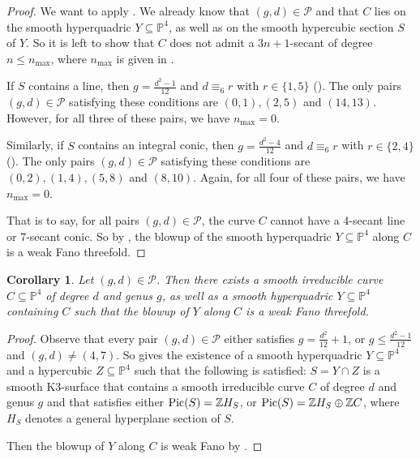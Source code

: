 \documentclass[english,11pt,reqno]{amsart}
\newcommand{\sub}{\subseteq}
\newcommand{\Pfour}{\mathbb{P}^4}
\newcommand{\Z}{\mathbb{Z}}
\newcommand{\Pic}{\textup{Pic}}
\newtheorem{cor}[thm]{Corollary}
\begin{document}
%
%
%
\begin{proof}
We want to apply . We already know that $(g,d)\in \mathcal{P}$ and that $C$ lies on the smooth hyperquadric $Y\sub \Pfour$, as well as on the smooth hypercubic section $S$ of $Y$. So it is left to show that $C$ does not admit a $3n+1$-secant of degree $n\leq n_{\max}$, where $n_{\max}$ is given in . \par
If $S$ contains a line, then $g=\frac{d^2-1}{12}$ and $d\equiv_6 r$ with $r\in\{1,5\}$ (). The only pairs $(g,d)\in \mathcal{P}$ satisfying these conditions are $(0,1),(2,5)$ and $(14,13)$. However, for all three of these pairs, we have $n_{\max}=0$. \par 
Similarly, if $S$ contains an integral conic, then $g=\frac{d^2-4}{12}$ and $d\equiv_6 r$ with $r\in\{2,4\}$ (). The only pairs $(g,d)\in \mathcal{P}$ satisfying these conditions are $(0,2),(1,4), (5,8)$ and $(8,10)$. Again, for all four of these pairs, we have $n_{\max}=0$. \par
That is to say, for all pairs $(g,d)\in \mathcal{P}$, the curve $C$ cannot have a 4-secant line or 7-secant conic. So by  , the blowup of the smooth hyperquadric $Y\sub \Pfour$ along $C$ is a weak Fano threefold.
\end{proof}
%
%
\begin{cor} \label{cor:existence_gdpairs_yielding_weak_Fano}
Let $(g,d)\in\mathcal{P}$. Then there exists a smooth irreducible curve $C\sub \Pfour$ of degree $d$ and genus $g$, as well as a smooth hyperquadric $Y\sub \Pfour$ containing $C$ such that the blowup of $Y$ along $C$ is a weak Fano threefold. 
\end{cor}
%
\begin{proof}
Observe that every pair $(g,d)\in \mathcal{P}$ either satisfies $g=\frac{d^2}{12}+1$, or $g\leq \frac{d^2-1}{12}$ and $(g,d)\neq(4,7)$. So  gives the existence of a smooth hyperquadric $Y\sub \Pfour$ and a hypercubic $Z\sub \Pfour$ such that the following is satisfied: $S=Y\cap Z$ is a smooth K3-surface that contains a smooth irreducible curve $C$ of degree $d$ and genus $g$ and that satisfies either $\Pic(S)=\Z H_S$, or $\Pic(S)=\Z H_S \oplus \Z C$, where $H_S$ denotes a general hyperplane section of $S$. \par 
Then the blowup of $Y$ along $C$ is weak Fano by . \par 
\end{proof}
%
%
\end{document}
